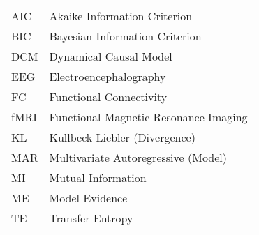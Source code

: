 \documentclass[a4paper,10pt]{article}
\begin{document}
\begin{tabular}{l l}
        AIC     &       Akaike Information Criterion \\
        BIC     &       Bayesian Information Criterion \\
	DCM	&	Dynamical Causal Model\\
	EEG	&	Electroencephalography\\
	FC	&	Functional Connectivity\\
	fMRI	&	Functional Magnetic Resonance Imaging\\
	KL	&	Kullbeck-Liebler (Divergence)\\
	MAR	&	Multivariate Autoregressive (Model)\\
	MI	&	Mutual Information\\
	ME	&	Model Evidence\\
	TE	&	Transfer Entropy
\end{tabular}
\end{document}
